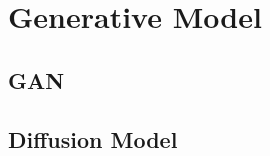 
\chapter{Generative Model}

\section{GAN}
\label{sec:gan}

\section{Diffusion Model}
\label{sec:diffusion-model}

